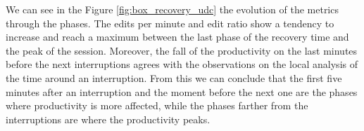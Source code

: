 \documentclass[times]{smrauth}
\begin{document}


We can see in the Figure \ref{fig:box_recovery_udc} the evolution of the metrics through
the phases. The edits per minute and edit ratio show a tendency to increase and reach a maximum between the last phase of the recovery time and the peak of the session. Moreover, the fall of the productivity on the last minutes before the next interruptions agrees with the observations on the local analysis of the time around an interruption. From this we can conclude that the first five minutes after an interruption and the moment before the next one are the phases where productivity is more affected, while the phases farther from the interruptions are where the productivity peaks.
\end{document}
